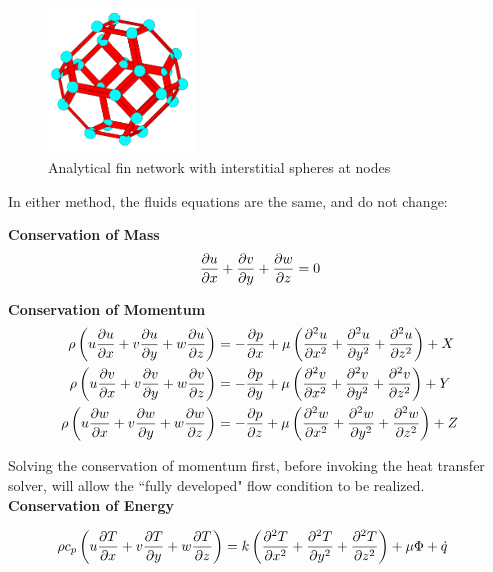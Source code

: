 \documentclass[asme2ejs.tex]{subfiles}
\begin{document}
\begin{figure}[t]
\begin{center}
\includegraphics[width=0.35\textwidth]{./figure/Cell_Analytical}
\end{center}
\caption{Analytical fin network with interstitial spheres at nodes}
\label{fig:flowregime}
\end{figure}


In either method, the fluids equations are the same, and do not change:

\noindent\textbf{Conservation of Mass}
\begin{equation}
 \frac{\partial u}{\partial x} + \frac{\partial v}{\partial y}  +  \frac{\partial w}{\partial z}  = 0
\end{equation}

\textbf{Conservation of Momentum}
\begin{align}
\rho \left( u  \frac{\partial u}{\partial x}  + v \frac{\partial u}{\partial y}  + w \frac{\partial u}{\partial z}  \right) &= -  \frac{\partial p}{\partial x}  + \mu \left(  \frac{\partial^{2} u}{\partial{x}^{2}} +  \frac{\partial^{2} u}{\partial{y}^{2}} +  \frac{\partial^{2} u}{\partial{z}^{2}} \right) + X\\
\rho \left( u  \frac{\partial v}{\partial x}  + v \frac{\partial v}{\partial y}  + w \frac{\partial v}{\partial z}  \right) &= -  \frac{\partial p}{\partial y}  + \mu \left(  \frac{\partial^{2} v}{\partial{x}^{2}} +  \frac{\partial^{2} v}{\partial{y}^{2}} +  \frac{\partial^{2} v}{\partial{z}^{2}}  \right) + Y \\
\rho \left( u  \frac{\partial w}{\partial x}  + v \frac{\partial w}{\partial y}  + w \frac{\partial w}{\partial z}  \right) &= -  \frac{\partial p}{\partial z}  + \mu \left(  \frac{\partial^{2} w}{\partial{x}^{2}} +  \frac{\partial^{2} w}{\partial{y}^{2}} +  \frac{\partial^{2} w}{\partial{z}^{2}}  \right) + Z
\end{align}

Solving the conservation of momentum first, before invoking the heat transfer solver, will allow the ``fully developed" flow condition to be realized. \\

\noindent\textbf{Conservation of Energy}

\begin{align}
\rho c_p \left( u  \frac{\partial T}{\partial x}  + v  \frac{\partial T}{\partial y}  + w  \frac{\partial T}{\partial z}  \right) &= k \left(  \frac{\partial^{2} T}{\partial{x}^{2}}+ \frac{\partial^{2} T}{\partial{y}^{2}} + \frac{\partial^{2} T}{\partial{z}^{2}} \right) + \mu \Phi + \dot{q}
\end{align}
\end{document}

